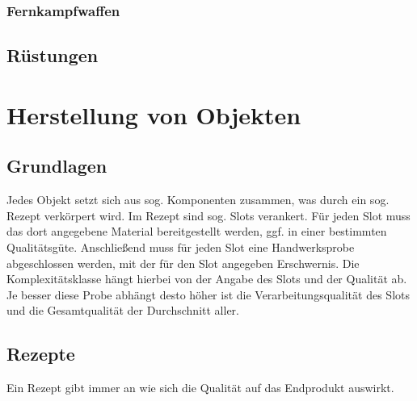 \documentclass[a4paper,12pt,oneside]{book}
\begin{document}
\section{Fernkampfwaffen}
\chapter{Rüstungen}



\part{Herstellung von Objekten}
\setcounter{chapter}{0}
\chapter{Grundlagen}
Jedes Objekt setzt sich aus sog. Komponenten zusammen, was durch ein sog. Rezept verkörpert wird. Im Rezept sind sog. Slots verankert. Für jeden Slot muss das dort angegebene Material bereitgestellt werden, ggf. in einer bestimmten Qualitätsgüte. Anschließend muss für jeden Slot eine Handwerksprobe abgeschlossen werden, mit der für den Slot angegeben Erschwernis. Die Komplexitätsklasse hängt hierbei von der Angabe des Slots und der Qualität ab. Je besser diese Probe abhängt desto höher ist die Verarbeitungsqualität des Slots und die Gesamtqualität der Durchschnitt aller.
\chapter{Rezepte}
Ein Rezept gibt immer an wie sich die Qualität auf das Endprodukt auswirkt.
\end{document}
